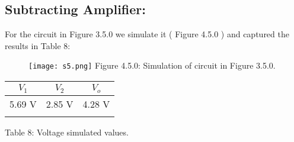 \subsection{Subtracting Amplifier:}

For the circuit in Figure 3.5.0 we simulate it ( Figure 4.5.0 ) and captured the results in Table 8:

\begin{figure}[H]
\texttt{[image: s5.png]}
\centering \linebreak \linebreak Figure 4.5.0: Simulation of circuit in Figure 3.5.0.
\end{figure} \hfill

\begin{center}
\begin{tabular}[.5cm]{c c c}
\toprule
\toprule
\hspace{60pt} $V_{1}$ \hspace{60pt} & \hspace{60pt} $V_{2}$ \hspace{60pt} & \hspace{60pt} $V_{o}$ \hspace{60pt}  \\
\midrule
\midrule
5.69 V & 2.85 V & 4.28 V \\
\bottomrule
\linebreak
\end{tabular}
\linebreak Table 8: Voltage simulated values.
\end{center} \hfill

\pagebreak
